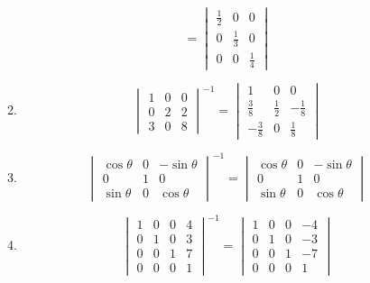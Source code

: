 \documentclass[a4paper]{report}
\begin{document}
\begin{enumerate}
\begin{enumerate}
\begin{equation*}
				=
				\begin{vmatrix}
					\frac{1}{2} & 0 & 0\\
					0 & \frac{1}{3} & 0\\
					0 & 0 & \frac{1}{4}
				\end{vmatrix}
			\end{equation*}
		\item
			\begin{equation*}
				\begin{vmatrix}
					1 & 0 & 0\\
					0 & 2 & 2\\
					3 & 0 & 8
				\end{vmatrix}^{-1}
				=
				\begin{vmatrix}
					1 & 0 & 0\\
					\frac{3}{8} & \frac{1}{2} & -\frac{1}{8}\\
					-\frac{3}{8} & 0 & \frac{1}{8}
				\end{vmatrix}
			\end{equation*}
		\item
			\begin{equation*}
				\begin{vmatrix}
					\cos \theta & 0 & -\sin \theta\\
					0 & 1 & 0\\
					\sin \theta & 0 & \cos \theta
				\end{vmatrix}^{-1}
				=
				\begin{vmatrix}
					\cos \theta & 0 & -\sin \theta\\
					0 & 1 & 0\\
					\sin \theta & 0 & \cos \theta
				\end{vmatrix}
			\end{equation*}
		\item
			\begin{equation*}
				\begin{vmatrix}
					1 & 0 & 0 & 4\\
					0 & 1 & 0 & 3\\
					0 & 0 & 1 & 7\\
					0 & 0 & 0 & 1
				\end{vmatrix}^{-1}
				=
				\begin{vmatrix}
					1 & 0 & 0 & -4\\
					0 & 1 & 0 & -3\\
					0 & 0 & 1 & -7\\
					0 & 0 & 0 & 1
				\end{vmatrix}
			\end{equation*}

\end{enumerate}
\end{enumerate}
\end{document}

